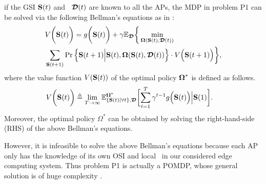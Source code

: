 if the GSI $\mathbf{S}(t)$ and \brlatency~$\boldsymbol{\mathcal{D}}(t)$ are known to all the APs,
the MDP in problem P1 can be solved via the following Bellman's equations as in \cite{sutton1998}:
{\small
\begin{align}
    &V\bigg(\mathbf{S}(t)\bigg) =g\bigg(\mathbf{S}(t)\bigg)
        + \gamma\mathbb{E}_{\boldsymbol{\mathcal{D}}}\bigg\{
            \min_{\boldsymbol{\Omega}(\mathbf{S}(t),\boldsymbol{\mathcal{D}}(t))}
            \nonumber\\
            &\sum_{\mathbf{S}(t+1)} \Pr \Big\{ 
                \mathbf{S}(t+1) \Big| \mathbf{S}(t), \boldsymbol{\Omega}(\mathbf{S}(t), \boldsymbol{\mathcal{D}}(t)) \Big\} \cdot V\Big(\mathbf{S}(t+1)\Big)
            \bigg\},
    \label{eqn:sp_0}
\end{align}
}%
where the value function $V(\mathbf{S}(t))$ of the optimal policy $\boldsymbol{\Omega}^{*}$ 
is defined as follows.
{\small
\begin{align}
    &V\Paren{\Stat(t)} \define
    \lim_{T\to\infty} 
    \mathbb{E}^{\Policy^*}_{\set{\Stat(t)|\forall t}, \Delay} \Bracket{
        \sum_{t=1}^{T} \gamma^{t-1} g\Big( \Stat(t) \Big) \Big| \Stat(1)
    }.
    \label{eqn:val_f}
\end{align}
}%
Moreover, the optimal policy $\Omega^{*}$ can be obtained by solving the right-hand-side (RHS) of the above Bellman's equations.

However, it is infeasible to solve the above Bellman's equations because each AP only has the knowledge of its own OSI and local \brlatency~in our considered edge computing system.
Thus problem P1 is actually a POMDP, whose general solution is of huge complexity \cite{IJCAI03-NairR,IJCAI99-BoutilierC}.
